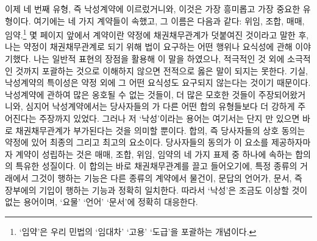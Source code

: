 이제 네 번째 유형, 즉 낙성계약에 이르렀거니와,
이것은 가장 흥미롭고 가장 중요한 유형이다.
여기에는 네 가지 계약들이 속했고, 그 이름은 다음과 같다:
위임, 조합,
매매, 임약.\footnote{%
  `임약'은 우리 민법의 `임대차' `고용' `도급'을 포괄하는 개념이다.
  }
몇 페이지 앞에서
계약이란 약정에 채권채무관계가 덧붙여진 것이라고 말한 후,
나는
약정이 채권채무관계로 되기 위해 법이 요구하는
어떤 행위나 요식성에 관해 이야기했다.
나는 일반적 표현의 장점을 활용해 이 말을 하였으나,
적극적인 것 외에 소극적인 것까지 포괄하는 것으로 이해하지 않으면
전적으로 옳은 말이 되지는 못한다.
기실,
낙성계약의 특이성은 약정 외에 그 어떤 요식성도
 요구되지 않는다는 것이기 때문이다.
낙성계약에 관하여 많은 옹호될 수 없는 것들이,
더 많은 모호한 것들이 주장되어왔거니와,
심지어 낙성계약에서는 당사자들의 가
다른 어떤 합의 유형들보다 더 강하게 주어진다는 주장까지 있었다.
그러나 저 `낙성'이라는 용어는
여기서는
단지 만 있으면 바로 채권채무관계가
부가된다는 것을 의미할 뿐이다.
합의, 즉 당사자들의 상호 동의는
약정에 있어 최종의 그리고 최고의 요소이다.
당사자들의 동의가 이 요소를 제공하자마자
 계약이 성립하는 것은
매매, 조합, 위임, 임약의 네 가지 표제 중 하나에 속하는
합의의 특유한 성질이다.
이 합의는 바로 채권채무관계를 끌고 들어오기에,
특정 종류의 거래에서 그것이 행하는 기능은
다른 종류의 계약에서 물건이, 문답의 언어가,
문서, 즉 장부에의 기입이 행하는 기능과 정확히 일치한다.
따라서 `낙성'은
조금도 이상할 것이 없는 용어이며,
`요물' `언어' `문서'에 정확히 대응한다.

